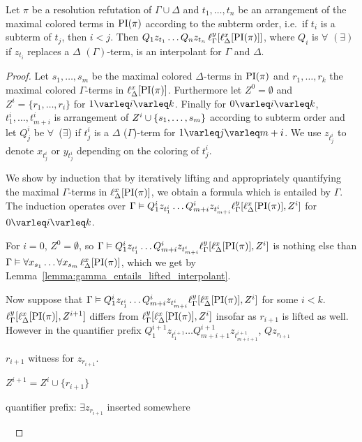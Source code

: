 \begin{thm}
	\label{thm:two_phases}
	Let $\pi$ be a resolution refutation of $\Gamma \cup \Delta$ and
	$t_1, \dots, t_n$ be an arrangement of the maximal colored terms in $\operatorname{PI}(\pi)$ according to the subterm order, i.e.\ if $t_i$ is a subterm of $t_j$, then $i<j$.
	Then
	$Q_1 z_{t_1} \ldots Q_n z_{t_n}\,\ell_{\Gamma}^{y}[\ell_{\Delta}^{x}[\operatorname{PI}(\pi)]]$, where $Q_i$ is $\forall$ $(\exists)$ if $z_{t_i}$ replaces a $\Delta$ $(\Gamma)$-term, is an interpolant for $\Gamma$ and $\Delta$.
\end{thm}
\begin{proof}


	Let $s_1, \dots, s_m$ be the maximal colored $\Delta$-terms in $\operatorname{PI}(\pi)$ and
	$r_1, \dots, r_k$ the maximal colored $\Gamma$-terms in $\ell_{\Delta}^{x}[\operatorname{PI}(\pi)]$.
	Furthermore let $Z^0 = \emptyset$ and $Z^i = \{r_1, \dots, r_i \}$ for $1\varleq i \varleq k$.
	Finally for $0\varleq i \varleq k$, 
	$t_1^i, \dots, t_{m+i}^i$ is arrangement of $Z^i \cup \{ s_1, \dots, s_m \}$ according to subterm order and
	let $Q_j^i$ be $\forall$~($\exists$) if $t_j^i$ is a $\Delta$ ($\Gamma$)-term for $1\varleq j \varleq m+i$.
	We use $z_{t_j^i}$ to denote $x_{t_j^i}$ or $y_{t_j^i}$ depending on the coloring of $t_j^i$.

	We show by induction that by iteratively lifting and appropriately quantifying the maximal $\Gamma$-terms in $\ell_{\Delta}^{x}[\operatorname{PI}(\pi)]$, we obtain a formula which is entailed by $\Gamma$.
	The induction operates over $\Gamma \vDash Q_1^i z_{t_1^i} \dots Q_{m+i}^i z_{t_{m+i}^i} \ell_{\Gamma}^{y}[ \ell_{\Delta}^{x}[\operatorname{PI}(\pi) ], Z^i ]$ for $0 \varleq i \varleq k$.

	For $i=0$, $Z^0 = \emptyset$, so $\Gamma \vDash Q_1^i z_{t_1^i} \dots Q_{m+i}^i z_{t_{m+i}^i} \ell_{\Gamma}^{y}[ \ell_{\Delta}^{x}[\operatorname{PI}(\pi) ], Z^i ]$ is nothing else than $\Gamma \vDash \forall x_{s_1} \ldots \forall x_{s_m}\,\ell_{\Delta}^{x}[\operatorname{PI}(\pi)]$, which we get by Lemma~\ref{lemma:gamma_entails_lifted_interpolant}.

	Now suppose that $\Gamma \vDash Q_1^i z_{t_1^i} \dots Q_{m+i}^i z_{t_{m+i}^i} \ell_{\Gamma}^{y}[ \ell_{\Delta}^{x}[\operatorname{PI}(\pi) ], Z^i ]$ for some $i < k$.
	$\ell_{\Gamma}^{y}[ \ell_{\Delta}^{x}[\operatorname{PI}(\pi) ], Z^{i+1} ]$ differs from $\ell_{\Gamma}^{y}[ \ell_{\Delta}^{x}[\operatorname{PI}(\pi) ], Z^i ]$ insofar as $r_{i+1}$ is lifted as well.
	However in the quantifier prefix 
	$Q_1^{i+1} z_{t_1^{i+1}} \dots Q_{m+{i+1}}^{i+1} z_{t_{m+{i+1}}^{i+1}}$, $Q z_{r_{i+1}}$
	
	$r_{i+1}$ witness for $z_{r_{i+1}}$.

	$Z^{i+1} = Z^i \cup \{ r_{i+1} \}$

	quantifier prefix: $\exists z_{r_{i+1}}$ inserted somewhere



	~



	\mytodo{}
\end{proof}
